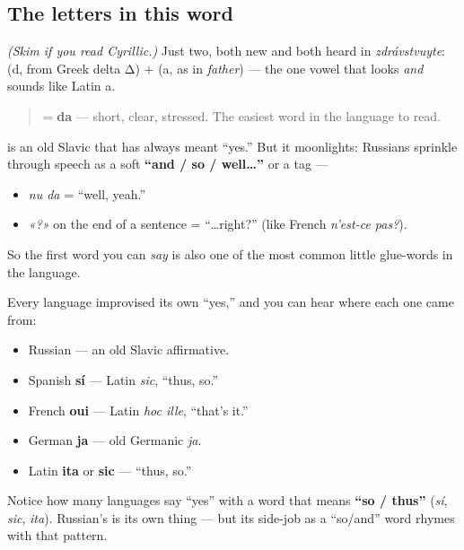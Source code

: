 \subsection*{The letters in this word}
\emph{(Skim if you read Cyrillic.)} Just two, both new and both heard in \emph{zdrávstvuyte}: \textbf{} (d, from Greek delta Δ) + \textbf{} (a, as in \emph{father}) — the one vowel that looks \emph{and} sounds like Latin a.

\begin{quote}
\textbf{} = \textbf{da} — short, clear, stressed. The easiest word in the language to read.
\end{quote}

\begin{cousinweb}
\textbf{} is an old Slavic \textbf{} that has always meant \textquotedblleft{}yes.\textquotedblright{} But it moonlights: Russians sprinkle \emph{} through speech as a soft \textbf{\textquotedblleft{}and / so / well…\textquotedblright{}} or a tag —

\begin{itemize}
\raggedright
  \item \emph{nu da} = \textquotedblleft{}well, yeah.\textquotedblright{}
  \item \emph{«?»} on the end of a sentence = \textquotedblleft{}…right?\textquotedblright{} (like French \emph{n'est-ce pas?}).
\end{itemize}

So the first word you can \emph{say} is also one of the most common little glue-words in the language.
\end{cousinweb}

\begin{cousinweb}
Every language improvised its own \textquotedblleft{}yes,\textquotedblright{} and you can hear where each one came from:

\begin{itemize}
\raggedright
  \item Russian \textbf{} — an old Slavic affirmative.
  \item Spanish \textbf{sí} — Latin \emph{sic}, \textquotedblleft{}thus, so.\textquotedblright{}
  \item French \textbf{oui} — Latin \emph{hoc ille}, \textquotedblleft{}that's it.\textquotedblright{}
  \item German \textbf{ja} — old Germanic \emph{ja}.
  \item Latin \textbf{ita} or \textbf{sic} — \textquotedblleft{}thus, so.\textquotedblright{}
\end{itemize}

Notice how many languages say \textquotedblleft{}yes\textquotedblright{} with a word that means \textbf{\textquotedblleft{}so / thus\textquotedblright{}} (\emph{sí}, \emph{sic}, \emph{ita}). Russian's \emph{} is its own thing — but its side-job as a \textquotedblleft{}so/and\textquotedblright{} word rhymes with that pattern.
\end{cousinweb}

